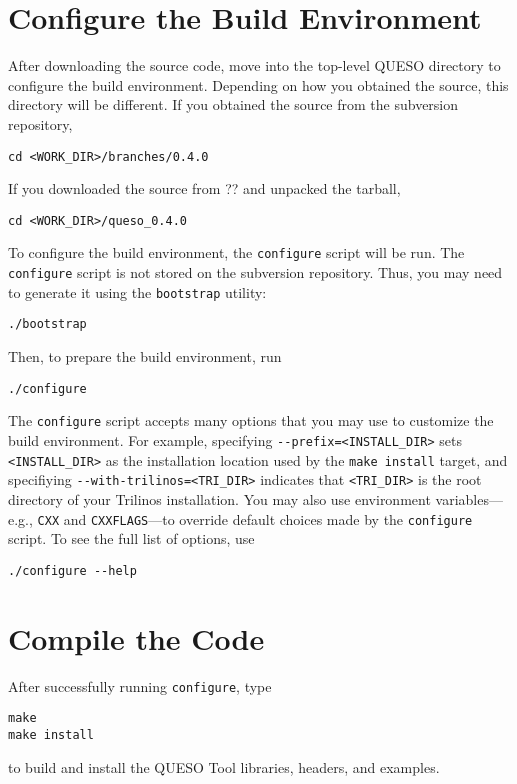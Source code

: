\section{Configure the Build Environment} \label{section:configure}
After downloading the source code, move into the top-level QUESO
directory to configure the build environment.  Depending on how you
obtained the source, this directory will be different.  If you
obtained the source from the subversion repository,
%
\begin{verbatim}
cd <WORK_DIR>/branches/0.4.0
\end{verbatim}
%
If you downloaded the source from ?? and unpacked the tarball,
%
\begin{verbatim}
cd <WORK_DIR>/queso_0.4.0
\end{verbatim}
%

To configure the build environment, the \verb+configure+ script will
be run.  The \verb+configure+ script is not stored on the subversion
repository.  Thus, you may need to generate it using the
\verb+bootstrap+ utility:
%
\begin{verbatim}
./bootstrap
\end{verbatim}
%
Then, to prepare the build environment, run
%
\begin{verbatim}
./configure
\end{verbatim}
%
The \verb+configure+ script accepts many options that you may use to
customize the build environment.  For example, specifying
\verb+--prefix=<INSTALL_DIR>+ sets \verb+<INSTALL_DIR>+ as the
installation location used by the \verb+make install+ target, and
specifiying \verb+--with-trilinos=<TRI_DIR>+ indicates that
\verb+<TRI_DIR>+ is the root directory of your Trilinos installation.
You may also use environment variables---e.g., \verb+CXX+ and
\verb+CXXFLAGS+---to override default choices made by the
\verb+configure+ script.  To see the full list of options, use
%
\begin{verbatim}
./configure --help
\end{verbatim}
%

\section{Compile the Code} \label{section:compile}
After successfully running \verb+configure+, type
%
\begin{verbatim}
make
make install
\end{verbatim}
%
to build and install the QUESO Tool libraries, headers, and examples.
